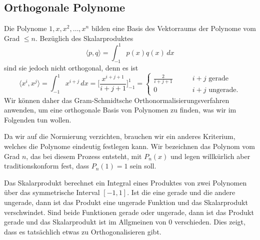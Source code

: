 \subsection{Orthogonale Polynome
\label{buch:integral:subsection:orthogonale-polynome}}
Die Polynome $1,x,x^2,\dots,x^n$ bilden eine Basis des Vektorraums
der Polynome vom Grad $\le n$.
Bezüglich des Skalarproduktes
\[
\langle p,q\rangle
=
\int_{-1}^1 p(x)q(x)\,dx
\]
sind sie jedoch nicht orthogonal, denn es ist
\[
\langle x^i,x^j\rangle
=
\int_{-1}^1 x^{i+j}\,dx
=
\biggl[\frac{x^{i+j+1}}{i+j+1}\biggr]_{-1}^1
=
\begin{cases}
\displaystyle
\frac{2}{i+j+1}&\qquad\text{$i+j$ gerade}\\
              0&\qquad\text{$i+j$ ungerade}.
\end{cases}
\]
Wir können daher das Gram-Schmidtsche Orthonormalisierungsverfahren
anwenden, um eine orthogonale Basis von Polynomen zu finden, was
wir im Folgenden tun wollen.


Da wir auf die Normierung verzichten, brauchen wir ein anderes
Kriterium, welches die Polynome eindeutig festlegen kann.
Wir bezeichnen das Polynom vom Grad $n$, das bei diesem Prozess
entsteht, mit $P_n(x)$ und legen willkürlich aber traditionskonform
fest, dass $P_n(1)=1$ sein soll.

Das Skalarprodukt berechnet ein Integral eines Produktes von zwei
Polynomen über das symmetrische Interval $[-1,1]$.
Ist die eine gerade und die andere ungerade, dann ist das
Produkt eine ungerade Funktion und das Skalarprodukt verschwindet.
Sind beide Funktionen gerade oder ungerade, dann ist das Produkt
gerade und das Skalarprodukt ist im Allgmeinen von $0$ verschieden.
Dies zeigt, dass es tatsächlich etwas zu Orthogonalisieren gibt.

